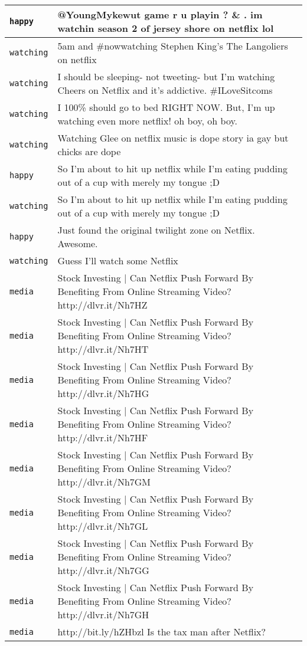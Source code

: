 \begin{center}
\begin{longtable}{|l|p{120mm}|}
      \tabularnewline\hline
         \texttt{happy} & @YoungMykewut game r u playin ? \& . im watchin season 2 of jersey shore on netflix lol
      \tabularnewline\hline
         \texttt{watching} & 5am and \#nowwatching Stephen King's The Langoliers on netflix
      \tabularnewline\hline
         \texttt{watching} & I should be sleeping- not tweeting- but I'm watching Cheers on Netflix and it's addictive. \#ILoveSitcoms
      \tabularnewline\hline
         \texttt{watching} & I 100\% should go to bed RIGHT NOW. But, I'm up watching even more netflix! oh boy, oh boy.
      \tabularnewline\hline
         \texttt{watching} & Watching Glee on netflix music is dope story ia gay but chicks are dope
      \tabularnewline\hline
         \texttt{happy} & So I'm about to hit up netflix while I'm eating pudding out of a cup with merely my tongue ;D
      \tabularnewline\hline
         \texttt{watching} & So I'm about to hit up netflix while I'm eating pudding out of a cup with merely my tongue ;D
      \tabularnewline\hline
         \texttt{happy} & Just found the original twilight zone on Netflix. Awesome.
      \tabularnewline\hline
         \texttt{watching} & Guess I'll watch some Netflix
      \tabularnewline\hline
         \texttt{media} & Stock Investing | Can Netflix Push Forward By Benefiting From Online Streaming Video? http://dlvr.it/Nh7HZ
      \tabularnewline\hline
         \texttt{media} & Stock Investing | Can Netflix Push Forward By Benefiting From Online Streaming Video? http://dlvr.it/Nh7HT
      \tabularnewline\hline
         \texttt{media} & Stock Investing | Can Netflix Push Forward By Benefiting From Online Streaming Video? http://dlvr.it/Nh7HG
      \tabularnewline\hline
         \texttt{media} & Stock Investing | Can Netflix Push Forward By Benefiting From Online Streaming Video? http://dlvr.it/Nh7HF
      \tabularnewline\hline
         \texttt{media} & Stock Investing | Can Netflix Push Forward By Benefiting From Online Streaming Video? http://dlvr.it/Nh7GM
      \tabularnewline\hline
         \texttt{media} & Stock Investing | Can Netflix Push Forward By Benefiting From Online Streaming Video? http://dlvr.it/Nh7GL
      \tabularnewline\hline
         \texttt{media} & Stock Investing | Can Netflix Push Forward By Benefiting From Online Streaming Video? http://dlvr.it/Nh7GG
      \tabularnewline\hline
         \texttt{media} & Stock Investing | Can Netflix Push Forward By Benefiting From Online Streaming Video? http://dlvr.it/Nh7GH
      \tabularnewline\hline
         \texttt{media} & http://bit.ly/hZHbzl Is the tax man after Netflix?
      \tabularnewline\hline

\end{longtable}
\end{center}
